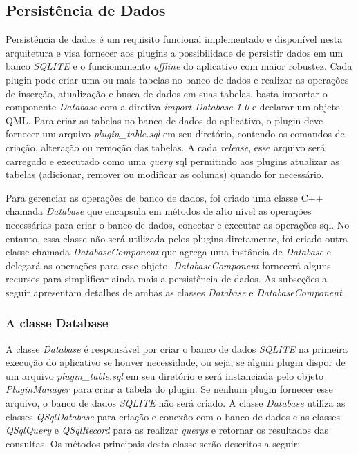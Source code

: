 \subsection{Persistência de Dados}\label{sec:solucao-desenvolvida}
Persistência de dados é um requisito funcional implementado e disponível nesta arquitetura e visa fornecer aos plugins a possibilidade de persistir dados em um banco \textit{SQLITE} e o funcionamento \textit{offline} do aplicativo com maior robustez. Cada plugin pode criar uma ou mais tabelas no banco de dados e realizar as operações de inserção, atualização e busca de dados em suas tabelas, basta importar o componente \textit{Database} com a diretiva \textit{import Database 1.0} e declarar um objeto QML. Para criar as tabelas no banco de dados do aplicativo, o plugin deve fornecer um arquivo \textit{plugin\_table.sql} em seu diretório, contendo os comandos de criação, alteração ou remoção das tabelas. A cada \textit{release}, esse arquivo será carregado e executado como uma \textit{query} sql permitindo aos plugins atualizar as tabelas (adicionar, remover ou modificar as colunas) quando for necessário.\par

Para gerenciar as operações de banco de dados, foi criado uma classe C++ chamada \textit{Database} que encapsula em métodos de alto nível as operações necessárias para criar o banco de dados, conectar e executar as operações sql. No entanto, essa classe não será utilizada pelos plugins diretamente, foi criado outra classe chamada \textit{DatabaseComponent} que agrega uma instância de \textit{Database} e delegará as operações para esse objeto. \textit{DatabaseComponent} fornecerá alguns recursos para simplificar ainda mais a persistência de dados. As subseções a seguir apresentam detalhes de ambas as classes \textit{Database} e \textit{DatabaseComponent}.

\subsubsection{A classe Database}\label{sec:solucao-desenvolvida}
A classe \textit{Database} é responsável por criar o banco de dados \textit{SQLITE} na primeira execução do aplicativo se houver necessidade, ou seja, se algum plugin dispor de um arquivo \textit{plugin\_table.sql} em seu diretório e será instanciada pelo objeto \textit{PluginManager} para criar a tabela do plugin. Se nenhum plugin fornecer esse arquivo, o banco de dados \textit{SQLITE} não será criado. A classe \textit{Database} utiliza as classes \textit{QSqlDatabase} para criação e conexão com o banco de dados e as classes \textit{QSqlQuery} e \textit{QSqlRecord} para as realizar \textit{querys} e retornar os resultados das consultas. Os métodos principais desta classe serão descritos a seguir:

